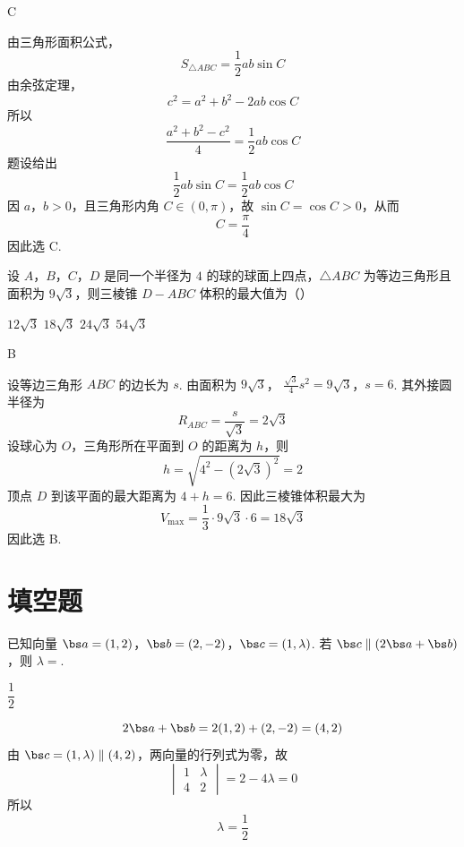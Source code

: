\begin{answer}
C
\end{answer}

\begin{solution}
由三角形面积公式，
\[
S_{\triangle ABC}=\frac12ab\sin C
\]
由余弦定理，
\[
c^2=a^2+b^2-2ab\cos C
\]
所以
\[
\frac{a^2+b^2-c^2}{4}=\frac12ab\cos C
\]
题设给出
\[
\frac12ab\sin C=\frac12ab\cos C
\]
因 \(a\)，\(b>0\)，且三角形内角 \(C\in(0,\pi)\)，故 \(\sin C=\cos C>0\)，从而
\[
C=\frac\pi4
\]
因此选 C.
\end{solution}

\begin{problem}
设 \(A\)，\(B\)，\(C\)，\(D\) 是同一个半径为 \(4\) 的球的球面上四点，\(\triangle ABC\) 为等边三角形且面积为 \(9\sqrt3\)，则三棱锥 \(D-ABC\) 体积的最大值为（\quad）

\choices
    {\(12\sqrt3\)}
    {\(18\sqrt3\)}
    {\(24\sqrt3\)}
    {\(54\sqrt3\)}
\end{problem}

\begin{answer}
B
\end{answer}

\begin{solution}
设等边三角形 \(ABC\) 的边长为 \(s\). 由面积为 \(9\sqrt3\)，
\(\frac{\sqrt3}{4}s^2=9\sqrt3\)，\(s=6\).
其外接圆半径为
\[
R_{ABC}=\frac{s}{\sqrt3}=2\sqrt3
\]
设球心为 \(O\)，三角形所在平面到 \(O\) 的距离为 \(h\)，则
\[
h=\sqrt{4^2-(2\sqrt3)^2}=2
\]
顶点 \(D\) 到该平面的最大距离为 \(4+h=6\). 因此三棱锥体积最大为
\[
V_{\max}=\frac13\cdot9\sqrt3\cdot6=18\sqrt3
\]
因此选 B.
\end{solution}

\section{填空题}

\begin{problem}
已知向量 \(\bs a=(1,2)\)，\(\bs b=(2,-2)\)，\(\bs c=(1,\lambda)\). 若 \(\bs c\parallel\left(2\bs a+\bs b\right)\)，则 \(\lambda=\)\fillinblank{}.
\end{problem}

\begin{answer}
\(\dfrac12\)
\end{answer}

\begin{solution}
\[
2\bs a+\bs b=2(1,2)+(2,-2)=(4,2)
\]
由 \(\bs c=(1,\lambda)\parallel(4,2)\)，两向量的行列式为零，故
\[
\begin{vmatrix}1&\lambda\\4&2\end{vmatrix}=2-4\lambda=0
\]
所以
\[
\lambda=\frac12
\]
\end{solution}

